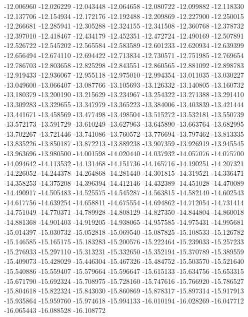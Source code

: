 -12.006960
-12.026229
-12.043448
-12.064658
-12.080722
-12.099882
-12.118330
-12.137706
-12.154934
-12.172176
-12.192488
-12.209869
-12.227900
-12.250015
-12.266681
-12.285941
-12.305288
-12.324155
-12.341508
-12.360768
-12.378732
-12.397010
-12.418467
-12.434179
-12.452351
-12.472724
-12.490169
-12.507891
-12.526722
-12.545202
-12.565584
-12.583589
-12.601233
-12.620934
-12.639399
-12.656494
-12.674110
-12.694422
-12.713834
-12.730571
-12.751985
-12.769654
-12.786703
-12.803658
-12.825298
-12.843551
-12.860565
-12.881092
-12.898783
-12.919433
-12.936067
-12.955118
-12.975010
-12.994354
-13.011035
-13.030227
-13.049600
-13.066407
-13.087766
-13.105693
-13.126332
-13.140805
-13.160732
-13.180379
-13.200190
-13.215629
-13.234967
-13.254322
-13.271388
-13.291410
-13.309283
-13.329655
-13.347979
-13.365223
-13.384006
-13.403839
-13.421444
-13.441671
-13.458569
-13.477498
-13.498504
-13.515272
-13.532181
-13.550739
-13.572173
-13.591729
-13.610249
-13.627963
-13.645890
-13.663764
-13.682995
-13.702267
-13.721446
-13.741086
-13.760572
-13.776694
-13.797462
-13.813335
-13.835226
-13.850187
-13.872213
-13.889238
-13.907359
-13.926919
-13.945545
-13.963696
-13.980500
-14.001598
-14.020440
-14.037932
-14.057076
-14.075700
-14.094642
-14.113532
-14.131468
-14.151736
-14.165716
-14.190251
-14.207321
-14.226052
-14.244378
-14.264868
-14.281440
-14.301815
-14.319521
-14.336471
-14.358253
-14.375208
-14.396394
-14.412146
-14.432389
-14.451028
-14.470089
-14.490917
-14.505483
-14.525575
-14.545287
-14.563815
-14.582140
-14.602543
-14.617756
-14.639254
-14.658811
-14.675554
-14.694862
-14.712054
-14.731414
-14.751049
-14.770371
-14.789928
-14.808129
-14.827350
-14.844804
-14.860018
-14.881368
-14.901403
-14.919205
-14.938065
-14.957585
-14.975431
-14.995681
-15.014397
-15.030732
-15.052818
-15.069540
-15.087825
-15.108533
-15.126782
-15.146585
-15.165175
-15.183283
-15.200576
-15.222464
-15.239033
-15.257233
-15.276933
-15.297110
-15.313231
-15.332650
-15.352194
-15.370789
-15.389559
-15.409073
-15.428029
-15.446304
-15.467326
-15.484752
-15.503570
-15.521640
-15.540886
-15.559407
-15.579664
-15.596647
-15.615133
-15.634756
-15.653315
-15.671790
-15.692324
-15.708975
-15.728160
-15.747616
-15.766920
-15.786527
-15.804618
-15.822324
-15.843030
-15.860869
-15.878317
-15.897314
-15.917913
-15.935864
-15.959760
-15.974618
-15.994133
-16.010194
-16.028269
-16.047712
-16.065443
-16.088528
-16.108772
